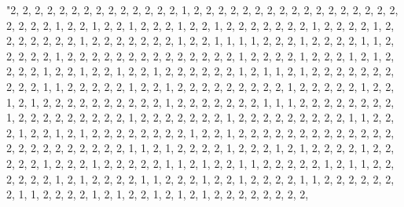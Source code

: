 \documentclass[
]{article}
\begin{document}
\begin{Schunk}
\begin{Soutput}
                                                                                                                                                                                                                                                                                                                                                                                                                                                                                                                                                                                                                                                                                                                                                                                                                                                                                                                                                                                                                                                                                                                                                                                                                                                                                                                                                                                                                                                                                                                                                                                                                                                                                                                                                                                                                                                                                                                                                                                                                                                                                                                                                            "2, 2, 2, 2, 2, 2, 2, 2, 2, 2, 2, 2, 2, 2, 1, 2, 2, 2, 2, 2, 2, 2, 2, 2, 2, 2, 2, 2, 2, 2, 2, 2, 2, 2, 2, 2, 1, 2, 2, 1, 2, 2, 1, 2, 2, 2, 1, 2, 2, 1, 2, 2, 2, 2, 2, 2, 2, 1, 2, 2, 2, 2, 1, 2, 2, 2, 2, 2, 2, 2, 1, 2, 2, 2, 2, 2, 2, 2, 1, 2, 2, 1, 1, 1, 1, 2, 2, 2, 1, 2, 2, 2, 2, 1, 1, 2, 2, 2, 2, 2, 1, 2, 2, 2, 2, 2, 2, 2, 2, 2, 2, 2, 2, 2, 2, 1, 2, 2, 2, 2, 1, 2, 2, 2, 1, 2, 1, 2, 2, 2, 2, 1, 2, 2, 1, 2, 2, 1, 2, 2, 1, 2, 2, 2, 2, 2, 2, 1, 2, 1, 1, 2, 1, 2, 2, 2, 2, 2, 2, 2, 2, 2, 2, 1, 1, 2, 2, 2, 2, 2, 1, 2, 2, 1, 2, 2, 2, 2, 2, 2, 2, 2, 2, 1, 2, 2, 2, 2, 2, 1, 2, 2, 1, 2, 1, 2, 2, 2, 2, 2, 2, 2, 2, 2, 2, 1, 2, 2, 2, 2, 2, 2, 2, 1, 1, 1, 2, 2, 2, 2, 2, 2, 2, 2, 1, 2, 2, 2, 2, 2, 2, 2, 2, 2, 1, 2, 2, 2, 2, 2, 2, 2, 1, 2, 2, 2, 2, 2, 2, 2, 2, 2, 1, 1, 2, 2, 2, 1, 2, 2, 1, 2, 1, 2, 2, 2, 2, 2, 2, 2, 2, 1, 2, 2, 1, 2, 2, 2, 2, 2, 2, 2, 2, 2, 2, 2, 2, 2, 2, 2, 2, 2, 2, 2, 2, 2, 2, 2, 1, 1, 2, 1, 2, 2, 2, 2, 1, 2, 2, 2, 1, 2, 1, 2, 2, 2, 2, 1, 2, 2, 2, 2, 2, 1, 2, 2, 2, 1, 2, 2, 2, 2, 2, 1, 1, 2, 1, 2, 2, 1, 1, 2, 2, 2, 2, 2, 1, 2, 1, 1, 2, 2, 2, 2, 2, 2, 1, 2, 1, 2, 2, 2, 2, 1, 1, 2, 2, 2, 1, 2, 2, 1, 2, 2, 2, 2, 1, 1, 2, 2, 2, 2, 2, 2, 2, 1, 1, 2, 2, 2, 2, 1, 2, 1, 2, 2, 1, 2, 1, 2, 1, 2, 2, 2, 2, 2, 2, 2, 2, 
\end{Soutput}
\end{Schunk}
\end{document}
